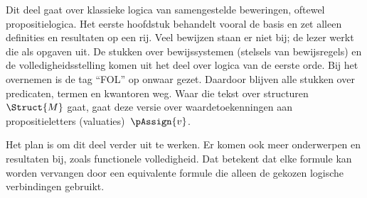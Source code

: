 \documentclass[../../include/open-logic-part]{subfiles}
\begin{document}

\begin{editorial}
  Dit deel gaat over klassieke logica van samengestelde beweringen,
  oftewel propositielogica. Het eerste hoofdstuk behandelt vooral de
  basis en zet alleen definities en resultaten op een rij. Veel bewijzen
  staan er niet bij; de lezer werkt die als opgaven uit. De stukken over
  bewijssystemen (stelsels van bewijsregels) en de volledigheidsstelling
  komen uit het deel over logica van de eerste orde. Bij het overnemen is
  de tag ``FOL'' op onwaar gezet. Daardoor blijven alle stukken over
  predicaten, termen en kwantoren weg. Waar die tekst over
  structuren~$\Struct{M}$ gaat, gaat deze versie over waardetoekenningen
  aan propositieletters (valuaties)~$\pAssign{v}$.

  Het plan is om dit deel verder uit te werken. Er komen ook meer
  onderwerpen en resultaten bij, zoals functionele volledigheid. Dat
  betekent dat elke formule kan worden vervangen door een equivalente
  formule die alleen de gekozen logische verbindingen gebruikt.
\end{editorial}










\OLEndPartHook
\end{document}
